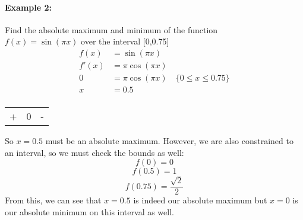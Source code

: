 \documentclass[../revisedmain.tex]{subfiles}
\begin{document}
	\paragraph{Example 2:}Find the absolute maximum and minimum of the function\\\(f(x)=\sin(\pi x)\) over the interval [0,0.75]
	\begin{equation}
		\begin{split}
		f(x)&=\sin(\pi x)\\
		f'(x)&=\pi\cos(\pi x)\\
		0&=\pi\cos(\pi x)\quad \{0\le x\le 0.75\}\\
		x&=0.5\\
		\end{split}
	\end{equation}
	\begin{center}
		\begin{tabular}{|c|c|c|}
		\hline
		[0,0.5)&0.5&(0.5,0.75]\\\hline
		+&0&-\\\hline
	\end{tabular}
	\end{center}\vspace{.25in}
	So $x=0.5$ must be an absolute maximum. However, we are also constrained to an interval, so we must check the bounds as well:\[f(0)=0\]\[f(0.5)=1\]\[f(0.75)=\displaystyle\frac{\sqrt{2}}{2}\]From this, we can see that $x=0.5$ is indeed our absolute maximum but $x=0$ is our absolute minimum on this interval as well.\\
\end{document}
